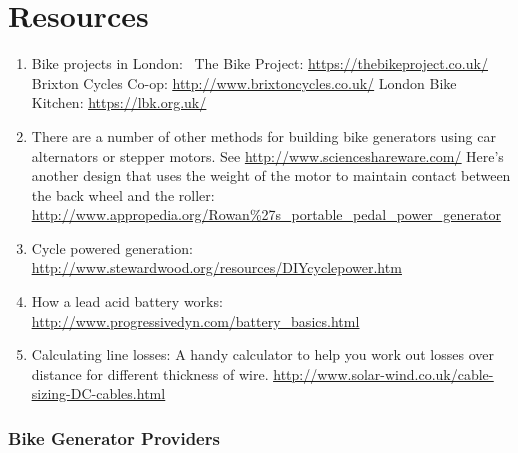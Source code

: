 \documentclass{article}
\theoremstyle{definition}
\theoremstyle{definition}
\theoremstyle{remark}
\begin{document}


{\color{blue}\section{Resources}} %
\label{sec:resources}

  \begin{enumerate}
    \item Bike projects in London:  \newline
      The Bike Project: \href{https://thebikeproject.co.uk/}{\underline{https://thebikeproject.co.uk/}} \newline
      Brixton Cycles Co-op: \href{http://www.brixtoncycles.co.uk/}{\underline{http://www.brixtoncycles.co.uk/}} \newline
      London Bike Kitchen: \href{https://lbk.org.uk/}{\underline{https://lbk.org.uk/}} \newline
    \item There are a number of other methods for building bike generators using car alternators or stepper motors. See \href{http://www.scienceshareware.com/}{\underline{http://www.scienceshareware.com/}} \newline
      Here’s another design that uses the weight of the motor to maintain contact between the back wheel and the roller: \href{http://www.appropedia.org/Rowan\%27s\_portable\_pedal\_power\_generator}{\underline{http://www.appropedia.org/Rowan\%27s\_portable\_pedal\_power\_generator}}
    \item Cycle powered generation: \href{http://www.stewardwood.org/resources/DIYcyclepower.htm}{\underline{http://www.stewardwood.org/resources/DIYcyclepower.htm}}
    \item How a lead acid battery works: \href{http://www.progressivedyn.com/battery_basics.html}{\underline{http://www.progressivedyn.com/battery\_basics.html}}
    \item Calculating line losses: A handy calculator to help you work out losses over distance for different thickness of wire. \href{http://www.solar-wind.co.uk/cable-sizing-DC-cables.html}{\underline{http://www.solar-wind.co.uk/cable-sizing-DC-cables.html}}
  \end{enumerate}

  \subsubsection{Bike Generator Providers} %
  \label{ssub:bike_generator_providers}
  
\end{document}
